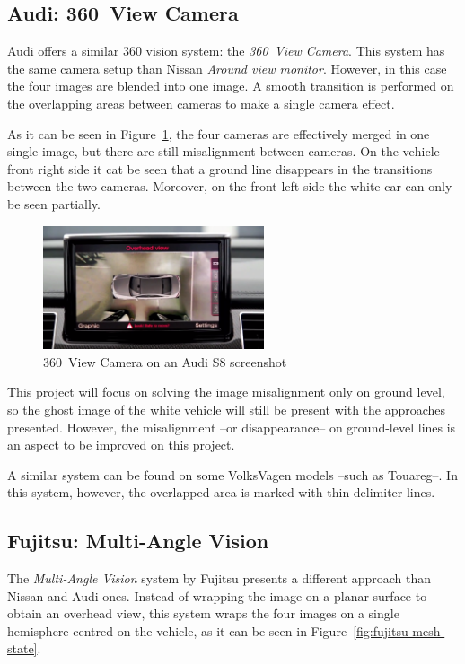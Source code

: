 \subsection{Audi: 360\degree~View Camera}\label{ssec:audi_commerc_state}
Audi offers a similar 360\degree{} vision system: the \emph{360\degree~View Camera}. This system has the same camera setup than Nissan \emph{Around view monitor}. However, in this case the four images are blended into one image. A smooth transition is performed on the overlapping areas between cameras to make a single camera effect. \cite{videoaudi}

As it can be seen in Figure~\ref{fig:audi-state}, the four cameras are effectively merged in one single image, but there are still misalignment between cameras. On the  vehicle front right side it cat be seen that a ground line disappears in the transitions between the two cameras. Moreover, on the front left side the white car can only be seen partially.  

\begin{figure}[h]
\center
\includegraphics[width=0.58\textwidth]{images/audi-state}
		\caption{360\degree~View Camera on an Audi S8 screenshot \cite{videoaudi}}
		\label{fig:audi-state}
\end{figure}

This project will focus on solving the image misalignment only on ground level, so the ghost image of the white vehicle will still be present with the approaches presented. However, the misalignment --or disappearance-- on ground-level lines is an aspect to be improved on this project.

A similar system can be found on some VolksVagen models --such as Touareg--. In this system, however, the overlapped area is marked with thin delimiter lines. \cite{touareg}

\subsection{Fujitsu: Multi-Angle Vision}
The \emph{Multi-Angle Vision} system by Fujitsu presents a different approach than Nissan and Audi ones. Instead of wrapping the image on a planar surface to obtain an overhead view, this system wraps the four images on a single hemisphere centred on the vehicle, as it can be seen in Figure~\ref{fig:fujitsu-mesh-state}. \cite{fujitsu}

